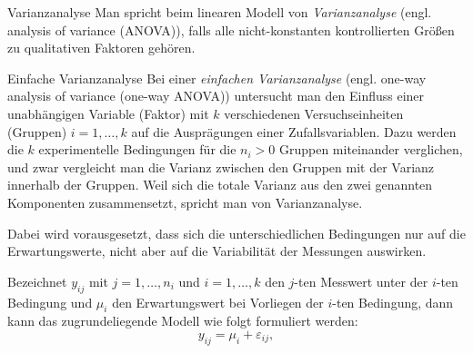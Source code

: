 \begin{defi}{Varianzanalyse}
    Man spricht beim linearen Modell von \emph{Varianzanalyse} (engl. analysis of variance (ANOVA)), falls alle nicht-konstanten kontrollierten Größen zu qualitativen Faktoren gehören.
\end{defi}

\begin{defi}[Varianzanalyse]{Einfache Varianzanalyse}
    Bei einer \emph{einfachen Varianzanalyse} (engl. one-way analysis of variance (one-way ANOVA)) untersucht man den Einfluss einer unabhängigen Variable (Faktor) mit $k$ verschiedenen Versuchseinheiten (Gruppen) $i = 1, \ldots, k$ auf die Ausprägungen einer Zufallsvariablen.
    Dazu werden die $k$ experimentelle Bedingungen für die $n_i > 0$ Gruppen miteinander verglichen, und zwar vergleicht man die Varianz zwischen den Gruppen mit der Varianz innerhalb der Gruppen.
    Weil sich die totale Varianz aus den zwei genannten Komponenten zusammensetzt, spricht man von Varianzanalyse.

    Dabei wird vorausgesetzt, dass sich die unterschiedlichen Bedingungen nur auf die Erwartungswerte, nicht aber auf die Variabilität der Messungen auswirken.

    Bezeichnet $y_{ij}$ mit $j = 1, \ldots, n_i$ und $i = 1, \ldots, k$ den $j$-ten Messwert unter der $i$-ten Bedingung und $\mu_i$ den Erwartungswert bei Vorliegen der $i$-ten Bedingung, dann kann das zugrundeliegende Modell wie folgt formuliert werden:
    \[
        y_{ij} = \mu_i + \varepsilon_{ij},
    \]


\end{defi}
